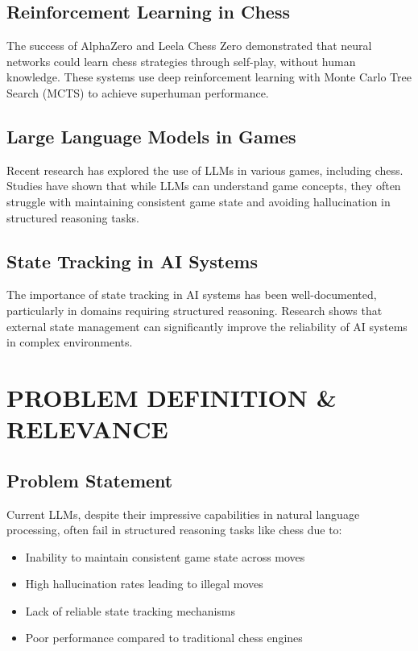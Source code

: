 \documentclass[11pt,a4paper]{report}
\begin{document}
\section{Reinforcement Learning in Chess}
The success of AlphaZero \cite{alphazero} and Leela Chess Zero \cite{leela_chess_zero} demonstrated that neural networks could learn chess strategies through self-play, without human knowledge. These systems use deep reinforcement learning with Monte Carlo Tree Search (MCTS) to achieve superhuman performance.

\section{Large Language Models in Games}
Recent research has explored the use of LLMs in various games, including chess. Studies have shown that while LLMs can understand game concepts, they often struggle with maintaining consistent game state and avoiding hallucination in structured reasoning tasks.

\section{State Tracking in AI Systems}
The importance of state tracking in AI systems has been well-documented, particularly in domains requiring structured reasoning. Research shows that external state management can significantly improve the reliability of AI systems in complex environments.

\chapter{PROBLEM DEFINITION \& RELEVANCE}
\thispagestyle{fancy}

\section{Problem Statement}
Current LLMs, despite their impressive capabilities in natural language processing, often fail in structured reasoning tasks like chess due to:
\begin{itemize}
    \item Inability to maintain consistent game state across moves
    \item High hallucination rates leading to illegal moves
    \item Lack of reliable state tracking mechanisms
    \item Poor performance compared to traditional chess engines
\end{itemize}
\end{document}

